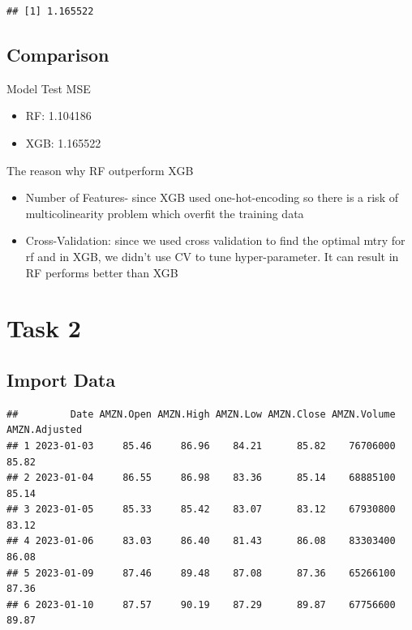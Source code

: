 \documentclass[
]{article}
\newenvironment{Shaded}{\begin{snugshade}}{\end{snugshade}}
\newcommand{\FunctionTok}[1]{\textcolor[rgb]{0.13,0.29,0.53}{\textbf{#1}}}
\newcommand{\NormalTok}[1]{#1}
\newcommand{\OtherTok}[1]{\textcolor[rgb]{0.56,0.35,0.01}{#1}}
\newcommand{\SpecialCharTok}[1]{\textcolor[rgb]{0.81,0.36,0.00}{\textbf{#1}}}
\newcommand{\StringTok}[1]{\textcolor[rgb]{0.31,0.60,0.02}{#1}}
\begin{document}
\begin{verbatim}
## [1] 1.165522
\end{verbatim}

\subsection{Comparison}\label{comparison}

Model Test MSE

\begin{itemize}
\item
  RF: 1.104186
\item
  XGB: 1.165522
\end{itemize}

The reason why RF outperform XGB

\begin{itemize}
\item
  Number of Features- since XGB used one-hot-encoding so there is a risk
  of multicolinearity problem which overfit the training data
\item
  Cross-Validation: since we used cross validation to find the optimal
  mtry for rf and in XGB, we didn't use CV to tune hyper-parameter. It
  can result in RF performs better than XGB
\end{itemize}

\section{Task 2}\label{task-2}

\subsection{Import Data}\label{import-data-1}

\begin{Shaded}
\end{Shaded}

\begin{verbatim}
##         Date AMZN.Open AMZN.High AMZN.Low AMZN.Close AMZN.Volume AMZN.Adjusted
## 1 2023-01-03     85.46     86.96    84.21      85.82    76706000         85.82
## 2 2023-01-04     86.55     86.98    83.36      85.14    68885100         85.14
## 3 2023-01-05     85.33     85.42    83.07      83.12    67930800         83.12
## 4 2023-01-06     83.03     86.40    81.43      86.08    83303400         86.08
## 5 2023-01-09     87.46     89.48    87.08      87.36    65266100         87.36
## 6 2023-01-10     87.57     90.19    87.29      89.87    67756600         89.87
\end{verbatim}
\end{document}
